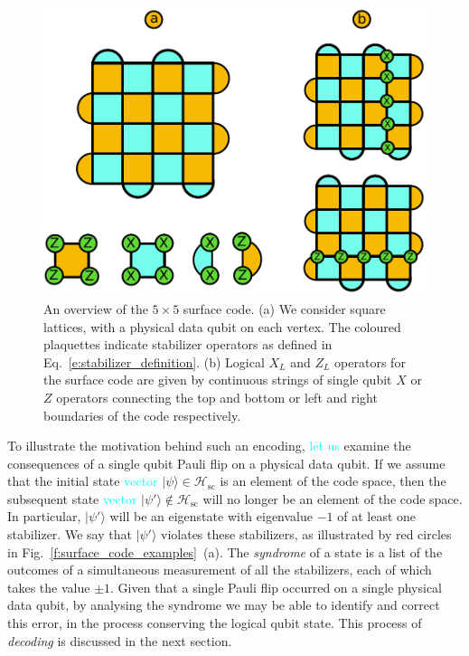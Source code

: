 \documentclass[twocolumn,preprintnumbers,amsmath,amssymb,notitlepage,nofootinbib,longbibliography,superscriptaddress,aps,pra,10pt]{revtex4-1}
\newcommand{\je}[1]{\textcolor{cyan}{#1}}
\begin{document}
	\begin{figure}
		\centering
		\includegraphics[width=0.8\linewidth]{figures/surface_code.pdf}
		\caption{
			An overview of the $5 \times 5$ surface code.
			(a) We consider square lattices, with a physical data qubit on each vertex.
			The coloured plaquettes indicate stabilizer operators as defined in Eq.~\eqref{e:stabilizer_definition}.
			(b) Logical $X_L$ and $Z_L$ operators for the surface code are given by continuous strings of single qubit $X$ or $Z$ operators connecting the top and bottom or left and right boundaries of the code respectively.
		}
		\label{f:surface_code}
	\end{figure}

	To illustrate the motivation behind such an encoding, \je{let us} examine the consequences of a single qubit Pauli flip on a physical data qubit.
	If we assume that the initial state \je{vector} $|\psi\rangle \in \mathcal{H}_\mathrm{sc}$ is an element of the code space, then the subsequent state 
	\je{vector} $|\psi'\rangle \not \in \mathcal{H}_\mathrm{sc}$ will no longer be an element of the code space.
	In particular, $|\psi'\rangle$ will be an eigenstate with eigenvalue $-1$ of at least one stabilizer.
	We say that $|\psi'\rangle$ violates these stabilizers, as illustrated by red circles in Fig.~\ref{f:surface_code_examples}~(a).
	The \textit{syndrome} of a state is a list of the outcomes of a simultaneous measurement of all the stabilizers, each of which takes the value $\pm 1$.
	Given that a single Pauli flip occurred on a single physical data qubit, by analysing the syndrome we may be able to identify and correct this error, in the process conserving the logical qubit state. 	This process of \textit{decoding} is discussed in the next section.
	
\end{document}
